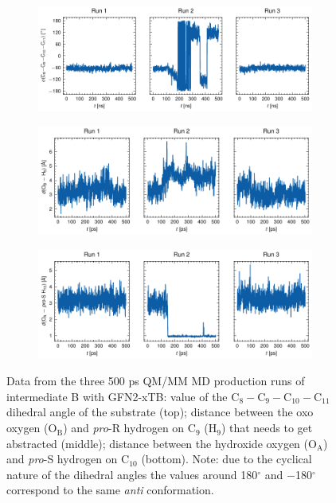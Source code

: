 \begin{figure}[htbp]
    \centering
    \begin{subfigure}{\textwidth}
        \centering
        \includegraphics[width=\textwidth]{Figures/xtb_C9-C10_all.pdf}
    \end{subfigure}
    \par\bigskip
    \begin{subfigure}{\textwidth}
        \centering
        \includegraphics[width=\textwidth]{Figures/xtb_Ob-H9_all.pdf}
    \end{subfigure}
    \par\bigskip
    \begin{subfigure}{\textwidth}
        \centering
        \includegraphics[width=\textwidth]{Figures/xtb_Oa-proSH10_all.pdf}
    \end{subfigure}
    \caption{Data from the three 500 ps QM/MM MD production runs of intermediate B with GFN2-xTB: value of the C$_8-$C$_9-$C$_{10}-$C$_{11}$ dihedral angle of the substrate (top); distance between the oxo oxygen (O$_{\text{B}}$) and \textit{pro}-R hydrogen on C$_9$ (H$_{9}$) that needs to get abstracted (middle); distance between the hydroxide oxygen (O$_{\text{A}}$) and \textit{pro}-S hydrogen on C$_{10}$ (bottom). Note: due to the cyclical nature of the dihedral angles the values around 180$^{\circ}$ and $-$180$^{\circ}$ correspond to the same \textit{anti} conformation.}
    \label{fig:xtb_appendix}
\end{figure}

